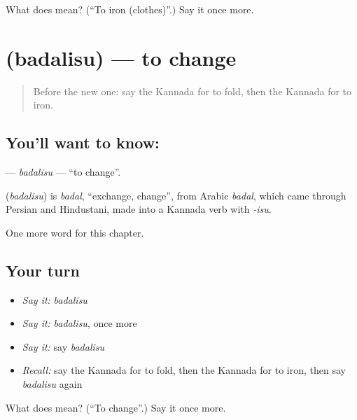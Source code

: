 \begin{tcolorbox}[breakable,colback=teal!4,colframe=teal!35!black,title={Before you move on}]
What does   mean? (\textquotedblleft{}To iron (clothes)\textquotedblright{}.) Say it once more.
\end{tcolorbox}
\section[\texorpdfstring{\kn{ಬದಲಿಸು} (badalisu)}{ಬದಲಿಸು (badalisu)}]{ (badalisu) — to change}

\label{lesson:KA-C199-badalisu}



\begin{quote}
Before the new one: say the Kannada for to fold, then the Kannada for to iron.
\end{quote}

\subsection*{You'll want to know: }
\textbf{} — \emph{badalisu} — \textquotedblleft{}to change\textquotedblright{}.

\begin{cousinweb}
\textbf{} (\emph{badalisu}) is \emph{badal}, \textquotedblleft{}exchange, change\textquotedblright{}, from Arabic \emph{badal}, which came through Persian and Hindustani, made into a Kannada verb with \emph{-isu}.
\end{cousinweb}

\begin{grammarlens}[title={What you've built}]
One more word for this chapter.
\end{grammarlens}

\subsection*{Your turn}
\begin{itemize}
\raggedright
  \item \emph{Say it:} \emph{badalisu}
  \item \emph{Say it:} \emph{badalisu}, once more
  \item \emph{Say it:} say \emph{badalisu}
  \item \emph{Recall:} say the Kannada for to fold, then the Kannada for to iron, then say \emph{badalisu} again
\end{itemize}

\begin{tcolorbox}[breakable,colback=teal!4,colframe=teal!35!black,title={Before you move on}]
What does  mean? (\textquotedblleft{}To change\textquotedblright{}.) Say it once more.
\end{tcolorbox}
